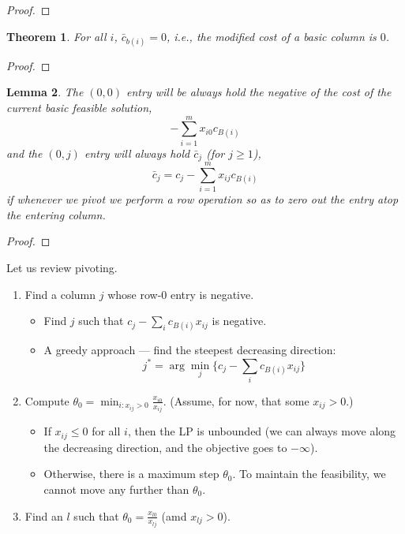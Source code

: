 \documentclass[11pt]{article} %
\theoremstyle{plain}%
\newtheorem{thm}{Theorem}[section]
\newtheorem{lem}[thm]{Lemma}
\theoremstyle{definition}
\theoremstyle{remark}
\begin{document}
\begin{proof}

\end{proof}

\begin{thm}
For all $i$, $\bar{c}_{b(i)} = 0$, i.e., the modified cost of a basic column is $0$. 
\end{thm}

\begin{proof}

\end{proof}

\begin{lem}
The $(0,0)$ entry will be always hold the negative of the cost of the current basic 
feasible solution, 
$$ - \sum_{i=1}^m x_{i0} c_{B(i)}$$
and the $(0,j)$ entry will always hold $\bar{c}_j$ (for $j \geq 1$), 
$$ \bar{c}_j = c_j - \sum_{i=1}^m x_{ij} c_{B(i)}$$
if whenever we pivot we perform a row operation so as to zero out the entry atop
the entering column. 
\end{lem}

\begin{proof}

\end{proof}

Let us review pivoting. 
\begin{enumerate}
	\item Find a column $j$ whose row-$0$ entry is negative. 
	\begin{itemize}
		\item Find $j$ such that $c_j - \sum_i c_{B(i)} x_{ij}$ is negative. 
		\item A greedy approach --- find the steepest decreasing direction: 
			\[ j^* = \arg \min_j \{ c_j - \sum_i c_{B(i)} x_{ij} \} \]
	\end{itemize}
	\item Compute $\theta_0 = \min_{i:x_{ij}>0} \frac{x_{i0}}{x_{ij}}$. 
	(Assume, for now, that some $x_{ij} > 0$.) 
	\begin{itemize}
		\item If $x_{ij} \leq 0$ for all $i$, then the LP is unbounded
		(we can always move along the decreasing direction, 
		and the objective goes to $-\infty$). 
		\item Otherwise, there is a maximum step $\theta_0$. To maintain 
		the feasibility, we cannot move any further than $\theta_0$. 
	\end{itemize}
	\item Find an $l$ such that $\theta_0 = \frac{x_{l0}}{x_{lj}}$ 
	(amd $x_{lj} > 0$). 
\end{enumerate}
\end{document}

